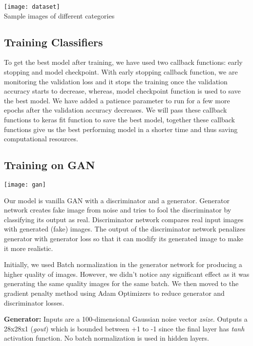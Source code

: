 \documentclass{article} %
\begin{document}
\begin{center}
          \texttt{[image: dataset]}\\
      \caption{Sample images of different categories}
\end{center}

\subsection{Training Classifiers}

To get the best model after training, we have used two callback functions: early stopping and model checkpoint. With early stopping callback function, we are monitoring the validation loss and it stops the training once the validation accuracy starts to decrease, whereas, model checkpoint function is used to save the best model. We have added a patience parameter to run for a few more epochs after the validation accuracy decreases. We will pass these callback functions to keras fit function to save the best model, together these callback functions give us the best performing model in a shorter time and thus saving computational resources.

\subsection{Training on GAN}
\bigskip
\begin{center}
\texttt{[image: gan]}
\end{center}
\bigskip
Our model is vanilla GAN with a discriminator and a generator. Generator network creates fake image from noise and tries to fool the discriminator by classifying its output as real. Discriminator network compares real input images with generated (fake) images. The output of the discriminator network penalizes generator with generator loss so that it can modify its generated image to make it more realistic.
 
Initially, we used Batch normalization in the generator network for producing a higher quality of images. However, we didn’t notice any significant effect as it was generating the same quality images for the same batch. We then moved to the gradient penalty method using Adam Optimizers to reduce generator and discriminator losses. 
 
\textbf{Generator:} Inputs are a 100-dimensional Gaussian noise vector \textit{z\textunderscore size}. Outputs a 28x28x1 (\textit{g\textunderscore out}) which is bounded between +1 to -1 since the final layer has \textit{tanh} activation function. No batch normalization is used in hidden layers.
 
\end{document}
